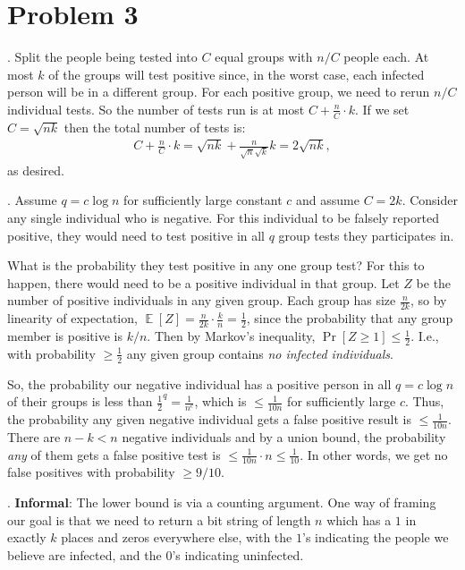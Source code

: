 \documentclass[11pt]{article}
\DeclareMathOperator*{\E}{\mathbb{E}}
\begin{document}
\section*{Problem 3}
	\smallskip{}.\hspace{1em}
	Split the people being tested into $C$ equal groups with $n/C$ people each. At most $k$ of the groups will test positive since, in the worst case, each infected person will be in a different group. For each positive group, we need to rerun $n/C$ individual tests. So the number of tests run is at most $C + \frac{n}{C}\cdot k$. If we set $C = \sqrt{nk}$ then the total number of tests is:
	\begin{align*}
		C + \frac{n}{C}\cdot k = \sqrt{nk} + \frac{n}{\sqrt{n}\sqrt{k}}k = 2\sqrt{nk},
	\end{align*}  as desired. 

\smallskip{}.\hspace{1em}
Assume $q = c\log n$ for sufficiently large constant $c$ and assume $C = 2k$. Consider any single individual who is negative. For this individual to be falsely reported positive, they would need to test positive in all $q$ group tests they participates in. 

What is the probability they test positive in any one group test? For this to happen, there would need to be a positive individual in that group. Let $Z$ be the number of positive individuals in any given group. Each group has size $\frac{n}{2k}$, so by linearity of expectation, $\E[Z] = \frac{n}{2k}\cdot \frac{k}{n} = \frac{1}{2}$, since the probability that any group member is positive is $k/n$. Then by Markov's inequality, $\Pr[Z \geq 1] \leq \frac{1}{2}$. I.e., with probability $\geq \frac{1}{2}$ any given group contains \emph{no infected individuals}. 

So, the probability our negative individual has a positive person in all $q = c\log n$ of their groups is less than $\frac{1}{2}^{q} = \frac{1}{n^c}$, which is $\leq \frac{1}{10n}$ for sufficiently large $c$. Thus, the probability any given negative individual gets a false positive result is $\leq \frac{1}{10n}$. There are $n - k < n$ negative individuals and by a union bound, the probability \emph{any} of them gets a false positive test is $\leq \frac{1}{10n}\cdot n \leq \frac{1}{10}$. In other words, we get no false positives with probability $\geq 9/10$. 

\smallskip{}.\hspace{1em} \textbf{Informal}: The lower bound is via a counting argument. One way of framing our goal is that we need to return a bit string of length $n$ which has a $1$ in exactly $k$ places and zeros everywhere else, with the $1$'s indicating the people we believe are infected, and the $0$'s indicating uninfected. 
\end{document}
